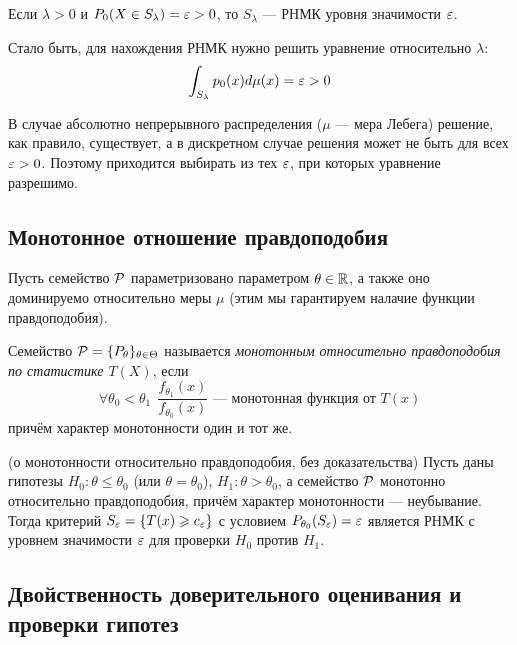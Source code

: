\begin{corollary}
	Если $\lambda > 0$ и $P_0(X \in S_\lambda) = \varepsilon > 0$, то $S_\lambda$ --- РНМК уровня значимости $\varepsilon$.
\end{corollary}

\begin{note}
	Стало быть, для нахождения РНМК нужно решить уравнение относительно $\lambda$:
	\[
		\int_{S_\lambda} p_0(x)d\mu(x) = \varepsilon > 0
	\]
	
	В случае абсолютно непрерывного распределения ($\mu$ --- мера Лебега) решение, как правило, существует, а в дискретном случае решения может не быть для всех $\varepsilon > 0$. Поэтому приходится выбирать из тех $\varepsilon$, при которых уравнение разрешимо.
\end{note}

\subsection{Монотонное отношение правдоподобия}

\begin{note}
	Пусть семейство $\mathcal{P}$ параметризовано параметром $\theta \in \mathbb{R}$, а также оно доминируемо относительно меры $\mu$ (этим мы гарантируем налачие функции правдоподобия).
\end{note}

\begin{definition}
	Семейство $\mathcal{P} = \{P_\theta\}_{\theta \in \Theta}$ называется \textit{монотонным относительно правдоподобия по статистике $T(X)$}, если
	\[
		\forall \theta_0 < \theta_1\ \ \frac{f_{\theta_1}(x)}{f_{\theta_0}(x)} \text{ --- монотонная функция от $T(x)$}
	\]
	причём характер монотонности один и тот же.
\end{definition}

\begin{theorem} (о монотонности относительно правдоподобия, без доказательства)
	Пусть даны гипотезы $H_0 \colon \theta \le \theta_0$ (или $\theta = \theta_0$), $H_1 \colon \theta > \theta_0$, а семейство $\mathcal{P}$ монотонно относительно правдоподобия, причём характер монотонности --- неубывание. Тогда критерий $S_{\varepsilon} = \{T(x) \geqslant c_{\varepsilon}\}$ с условием $P_{\theta_0}(S_{\varepsilon}) = \varepsilon$ является РНМК с уровнем значимости $\varepsilon$ для проверки $H_0$ против $H_1$.
\end{theorem}

\subsection{Двойственность доверительного оценивания и проверки гипотез}


